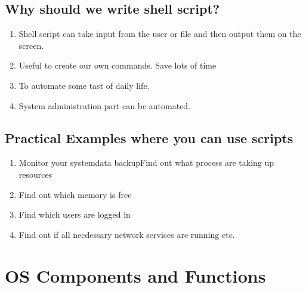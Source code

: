 \documentclass[11pt]{article}
\begin{document}
\subsection{Why should we write shell script?}
\begin{enumerate}
	\item Shell script can take input from the user or file and then output them on the screen.
	\item Useful to create our own commands. Save lots of time
	\item To automate some tast of daily life.
	\item System administration part can be automated.
\end{enumerate}

\subsection{Practical Examples where you can use scripts}
\begin{enumerate}
	\item Monitor your systemdata backupFind out what process are taking up resources
	\item Find out which memory is free
	\item Find which users are logged in
	\item Find out if all necdessary network services are running etc.
\end{enumerate}


\section{OS Components and Functions}
\end{document}
